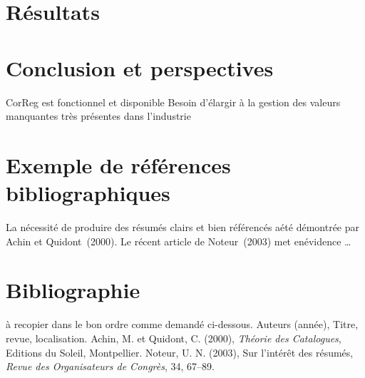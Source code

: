 \documentclass[12pt]{article}
\begin{document}
\section{R\'esultats}	
\section{Conclusion et perspectives}
	CorReg est fonctionnel et disponible
	Besoin d'\'elargir à la gestion des valeurs manquantes tr\`es pr\'esentes dans l'industrie
\section{Exemple de r\'ef\'erences bibliographiques}
La n\'ecessit\'e de produire des r\'esum\'es clairs et bien
r\'ef\'erenc\'es a\'et\'e d\'emontr\'ee par Achin et Quidont~(2000). Le
r\'ecent article de Noteur~(2003) met en\'evidence \dots
\section*{Bibliographie}
\cite{marquardt1975ridge}
{}

à recopier dans le bon ordre comme demand\'e ci-dessous.
\noindent [1] Auteurs (ann\'ee), Titre, revue, localisation.
\noindent [2] Achin, M. et Quidont, C. (2000), {\it Th\'eorie des
Catalogues}, Editions du Soleil, Montpellier.
\noindent [3] Noteur, U. N. (2003), Sur l'int\'er\^et des
r\'esum\'es, {\it Revue des Organisateurs de Congr\`es}, 34, 67--89.
\end{document}
